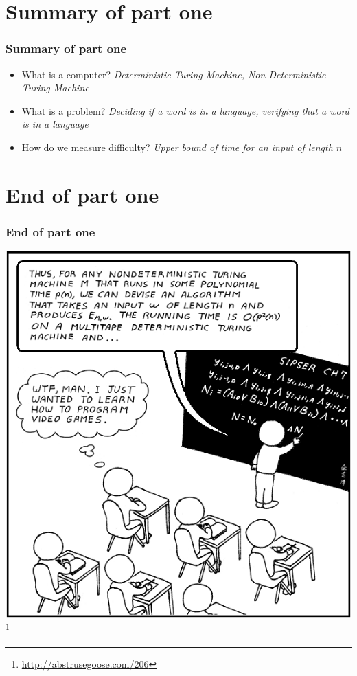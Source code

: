 \documentclass[aspectratio=169]{beamer}
\begin{document}
\section{Summary of part one}

\begin{frame}
\frametitle{Summary of part one}
\begin{itemize}
    \item What is a computer? {\em Deterministic Turing Machine, Non-Deterministic Turing Machine}
    \item What is a problem? {\em Deciding if a word is in a language, verifying that a word is in a language}
    \item How do we measure difficulty? {\em Upper bound of time for an input of length $n$}
\end{itemize}
\end{frame}

\section{End of part one}

\begin{frame}
\frametitle{End of part one}
\begin{center}
\includegraphics[scale=0.3]{ag_comic}\footnote{\url{http://abstrusegoose.com/206}}
\end{center}
\end{frame}
\end{document}
